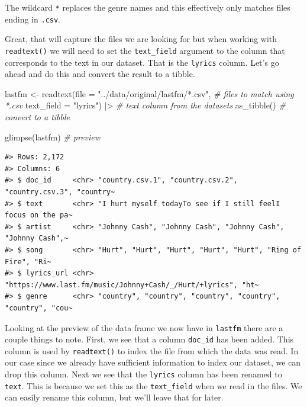 \documentclass[
  letterpaper,
]{scrbook}
\newenvironment{Shaded}{\begin{snugshade}}{\end{snugshade}}
\newcommand{\AttributeTok}[1]{\textcolor[rgb]{0.00,0.00,0.00}{#1}}
\newcommand{\CommentTok}[1]{\textcolor[rgb]{0.00,0.00,0.00}{\textit{#1}}}
\newcommand{\FunctionTok}[1]{\textcolor[rgb]{0.00,0.00,0.00}{#1}}
\newcommand{\NormalTok}[1]{\textcolor[rgb]{0.00,0.00,0.00}{#1}}
\newcommand{\OtherTok}[1]{\textcolor[rgb]{0.00,0.00,0.00}{#1}}
\newcommand{\SpecialCharTok}[1]{\textcolor[rgb]{0.00,0.00,0.00}{#1}}
\newcommand{\StringTok}[1]{\textcolor[rgb]{0.00,0.00,0.00}{#1}}
\begin{document}
The wildcard \texttt{*} replaces the genre names and this effectively
only matches files ending in \texttt{.csv}.

Great, that will capture the files we are looking for but when working
with \texttt{readtext()} we will need to set the \texttt{text\_field}
argument to the column that corresponds to the text in our dataset. That
is the \texttt{lyrics} column. Let's go ahead and do this and convert
the result to a tibble.

\begin{Shaded}
\begin{Highlighting}[]
\NormalTok{lastfm }\OtherTok{\textless{}{-}} 
  \FunctionTok{readtext}\NormalTok{(}\AttributeTok{file =} \StringTok{"../data/original/lastfm/*.csv"}\NormalTok{, }\CommentTok{\# files to match using *.csv}
           \AttributeTok{text\_field =} \StringTok{"lyrics"}\NormalTok{) }\SpecialCharTok{|\textgreater{}} \CommentTok{\# text column from the datasets}
  \FunctionTok{as\_tibble}\NormalTok{() }\CommentTok{\# convert to a tibble}

\FunctionTok{glimpse}\NormalTok{(lastfm) }\CommentTok{\# preview}
\end{Highlighting}
\end{Shaded}

\begin{verbatim}
#> Rows: 2,172
#> Columns: 6
#> $ doc_id     <chr> "country.csv.1", "country.csv.2", "country.csv.3", "country~
#> $ text       <chr> "I hurt myself todayTo see if I still feelI focus on the pa~
#> $ artist     <chr> "Johnny Cash", "Johnny Cash", "Johnny Cash", "Johnny Cash",~
#> $ song       <chr> "Hurt", "Hurt", "Hurt", "Hurt", "Hurt", "Ring of Fire", "Ri~
#> $ lyrics_url <chr> "https://www.last.fm/music/Johnny+Cash/_/Hurt/+lyrics", "ht~
#> $ genre      <chr> "country", "country", "country", "country", "country", "cou~
\end{verbatim}

Looking at the preview of the data frame we now have in \texttt{lastfm}
there are a couple things to note. First, we see that a column
\texttt{doc\_id} has been added. This column is used by
\texttt{readtext()} to index the file from which the data was read. In
our case since we already have sufficient information to index our
dataset, we can drop this column. Next we see that the \texttt{lyrics}
column has been renamed to \texttt{text}. This is because we set this as
the \texttt{text\_field} when we read in the files. We can easily rename
this column, but we'll leave that for later.
\end{document}
